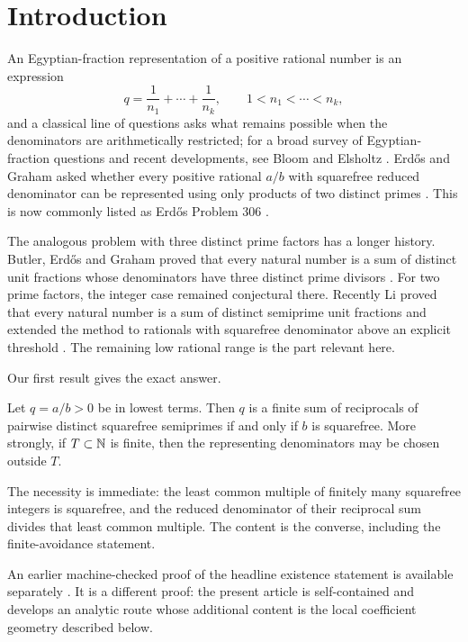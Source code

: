 \section{Introduction}

An Egyptian-fraction representation of a positive rational number is an expression
\[
q=\frac1{n_1}+\cdots+\frac1{n_k},
\qquad
1<n_1<\cdots<n_k,
\]
and a classical line of questions asks what remains possible when the denominators are arithmetically restricted; for a broad survey of Egyptian-fraction questions and recent developments, see Bloom and Elsholtz \cite{BloomElsholtz2022}. Erd\H{o}s and Graham asked whether every positive rational $a/b$ with squarefree reduced denominator can be represented using only products of two distinct primes \cite{ErdosGraham1980}. This is now commonly listed as Erd\H{o}s Problem 306 \cite{ErdosProblem306}.

The analogous problem with three distinct prime factors has a longer history. Butler, Erd\H{o}s and Graham proved that every natural number is a sum of distinct unit fractions whose denominators have three distinct prime divisors \cite{ButlerErdosGraham2015}. For two prime factors, the integer case remained conjectural there. Recently Li proved that every natural number is a sum of distinct semiprime unit fractions and extended the method to rationals with squarefree denominator above an explicit threshold \cite{Li2026}. The remaining low rational range is the part relevant here.

Our first result gives the exact answer.

\begin{theorem}\label{thm:characterization}
Let $q=a/b>0$ be in lowest terms. Then $q$ is a finite sum of reciprocals of pairwise distinct squarefree semiprimes if and only if $b$ is squarefree. More strongly, if $T\subset\mathbb N$ is finite, then the representing denominators may be chosen outside $T$.
\end{theorem}

The necessity is immediate: the least common multiple of finitely many squarefree integers is squarefree, and the reduced denominator of their reciprocal sum divides that least common multiple. The content is the converse, including the finite-avoidance statement.

An earlier machine-checked proof of the headline existence statement is available separately \cite{TangFormal2026}. It is a different proof: the present article is self-contained and develops an analytic route whose additional content is the local coefficient geometry described below.

